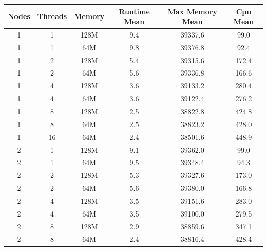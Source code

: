 \documentclass{article}
\begin{document}
\begin{center}
\begin{tabular}{|c|c|c|c|c|c|}
\hline
Nodes & Threads & Memory & Runtime Mean & Max Memory Mean & Cpu Mean \\
\hline
1 & 1 & 128M & 9.4 & 39337.6 & 99.0 \\
1 & 1 & 64M & 9.8 & 39376.8 & 92.4 \\
1 & 2 & 128M & 5.4 & 39315.6 & 172.4 \\
1 & 2 & 64M & 5.6 & 39336.8 & 166.6 \\
1 & 4 & 128M & 3.6 & 39133.2 & 280.4 \\
1 & 4 & 64M & 3.6 & 39122.4 & 276.2 \\
1 & 8 & 128M & 2.5 & 38822.8 & 424.8 \\
1 & 8 & 64M & 2.5 & 38823.2 & 428.0 \\
1 & 16 & 64M & 2.4 & 38501.6 & 448.9 \\
\hline
2 & 1 & 128M & 9.1 & 39362.0 & 99.0 \\
2 & 1 & 64M & 9.5 & 39348.4 & 94.3 \\
2 & 2 & 128M & 5.3 & 39327.6 & 173.0 \\
2 & 2 & 64M & 5.6 & 39380.0 & 166.8 \\
2 & 4 & 128M & 3.5 & 39151.6 & 283.0 \\
2 & 4 & 64M & 3.5 & 39100.0 & 279.5 \\
2 & 8 & 128M & 2.9 & 38859.6 & 347.1 \\
2 & 8 & 64M & 2.4 & 38816.4 & 428.4 \\
\hline
\end{tabular}
\end{center}
\end{document}
